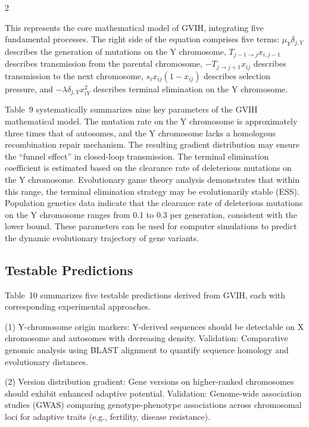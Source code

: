 \documentclass{base}
\begin{document}
\begin{multicols}{2}

This represents the core mathematical model of GVIH, integrating five fundamental processes. The right side of the equation comprises five terms: $\mu_Y\delta_{j,Y}$ describes the generation of mutations on the Y chromosome, $T_{j-1 \rightarrow j}x_{i,j-1}$ describes transmission from the parental chromosome, $-T_{j \rightarrow j+1}x_{ij}$ describes transmission to the next chromosome, $s_i x_{ij}(1-x_{ij})$ describes selection pressure, and $-\lambda\delta_{j,Y}x_{iY}^2$ describes terminal elimination on the Y chromosome.

Table~9 systematically summarizes nine key parameters of the GVIH mathematical model. The mutation rate on the Y chromosome is approximately three times that of autosomes, and the Y chromosome lacks a homologous recombination repair mechanism. The resulting gradient distribution may ensure the ``funnel effect'' in closed-loop transmission. The terminal elimination coefficient is estimated based on the clearance rate of deleterious mutations on the Y chromosome. Evolutionary game theory analysis demonstrates that within this range, the terminal elimination strategy may be evolutionarily stable (ESS). Population genetics data indicate that the clearance rate of deleterious mutations on the Y chromosome ranges from 0.1 to 0.3 per generation, consistent with the lower bound. These parameters can be used for computer simulations to predict the dynamic evolutionary trajectory of gene variants.



\subsection{Testable Predictions}

Table~10 summarizes five testable predictions derived from GVIH, each with corresponding experimental approaches. 

(1) Y-chromosome origin markers: Y-derived sequences should be detectable on X chromosome and autosomes with decreasing density. Validation: Comparative genomic analysis using BLAST alignment to quantify sequence homology and evolutionary distances. 

(2) Version distribution gradient: Gene versions on higher-ranked chromosomes should exhibit enhanced adaptive potential. Validation: Genome-wide association studies (GWAS) comparing genotype-phenotype associations across chromosomal loci for adaptive traits (e.g., fertility, disease resistance). 


\end{multicols}
\end{document}
